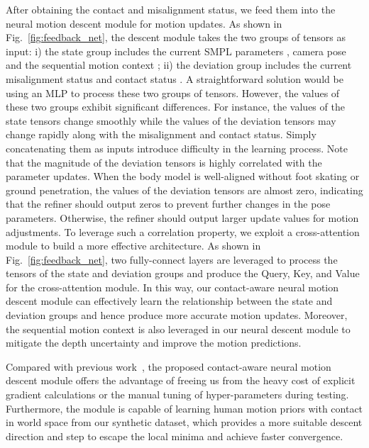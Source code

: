 \documentclass[10pt,twocolumn,letterpaper]{article}
\begin{document}
After obtaining the contact and misalignment status, we feed them into the neural motion descent module for motion updates.
As shown in Fig.~\ref{fig:feedback_net}, the descent module takes the two groups of tensors as input: 
i) the state group includes the current SMPL parameters , camera pose  and the sequential motion context ;
ii) the deviation group includes the current misalignment status  and contact status .
A straightforward solution would be using an MLP to process these two groups of tensors.
However, the values of these two groups exhibit significant differences.
For instance, the values of the state tensors change smoothly while the values of the deviation tensors may change rapidly along with the misalignment and contact status.
Simply concatenating them as inputs introduce difficulty in the learning process.
Note that the magnitude of the deviation tensors is highly correlated with the parameter updates.
When the body model is well-aligned without foot skating or ground penetration, the values of the deviation tensors are almost zero, indicating that the refiner should output zeros to prevent further changes in the pose parameters.
Otherwise, the refiner should output larger update values for motion adjustments.
To leverage such a correlation property, we exploit a cross-attention module to build a more effective architecture.
As shown in Fig.~\ref{fig:feedback_net}, two fully-connect layers are leveraged to process the tensors of the state and deviation groups and produce the Query, Key, and Value for the cross-attention module.
In this way, our contact-aware neural motion descent module can effectively learn the relationship between the state and deviation groups and hence produce more accurate motion updates.
Moreover, the sequential motion context  is also leveraged in our neural descent module to mitigate the depth uncertainty and improve the motion predictions.



Compared with previous work~\cite{rempe2021humor, zhang2021learning,song2020human, zanfir2021neural}, the proposed contact-aware neural motion descent module offers the advantage of freeing us from the heavy cost of explicit gradient calculations or the manual tuning of hyper-parameters during testing.
Furthermore, the module is capable of learning human motion priors with contact in world space from our synthetic dataset, which provides a more suitable descent direction and step to escape the local minima and achieve faster convergence.
\end{document}
